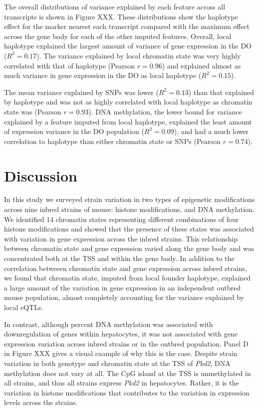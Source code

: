 \documentclass[10pt,letterpaper]{article}
\begin{document}
The overall distributions of variance explained by each feature across
all transcripts is shown in Figure XXX. These distributions show the
haplotype effect for the marker nearest each transcript compared with
the maximum effect across the gene body for each of the other imputed
features. Overall, local haplotype explained the largest amount of
variance of gene expression in the DO (\(R^2 = 0.17\)). The variance
explained by local chromatin state was very highly correlated with that
of haplotype (Pearson \(r = 0.96\)) and explained almost as much
variance in gene expression in the DO as local haplotype
(\(R^2 = 0.15\)).

The mean variance explained by SNPs was lower (\(R^2 = 0.13\)) than that
explained by haplotype and was not as highly correlated with local
haplotype as chromatin state was (Pearson \(r = 0.93\)). DNA
methylation, the lower bound for variance explained by a feature imputed
from local haplotype, explained the least amount of expression variance
in the DO population (\(R^2 = 0.09\)), and had a much lower correlation
to haplotype than either chromatin state or SNPs (Pearson \(r = 0.74\)).

\hypertarget{discussion}{%
\section{Discussion}\label{discussion}}

In this study we surveyed strain variation in two types of epigenetic
modifications across nine inbred strains of mouse: histone
modifications, and DNA methylation. We identified 14 chromatin states
representing different combinations of four histone modifications and
showed that the presence of these states was associated with variation
in gene expression across the inbred strains. This relationship between
chromatin state and gene expression varied along the gene body and was
concentrated both at the TSS and within the gene body. In addition to
the correlation betweeen chromatin state and gene expression across
inbred strains, we found that chromatin state, imputed from local
founder haplotype, explained a large amount of the variation in gene
expression in an independent outbred mouse population, almost completely
accounting for the variance explained by local eQTLs.

In contrast, although percent DNA methylation was associated with
downregulation of genes within hepatocytes, it was not associated with
gene expression variation across inbred strains or in the outbred
population. Panel D in Figure XXX gives a visual example of why this is
the case. Despite strain variation in both genotype and chromatin state
at the TSS of \textit{Pkd2}, DNA methylation does not vary at all. The
CpG island at the TSS is unmethylated in all strains, and thus all
strains express \textit{Pkd2} in hepatocytes. Rather, it is the
variation in histone modifications that contributes to the variation in
expression levels across the strains.
\end{document}

